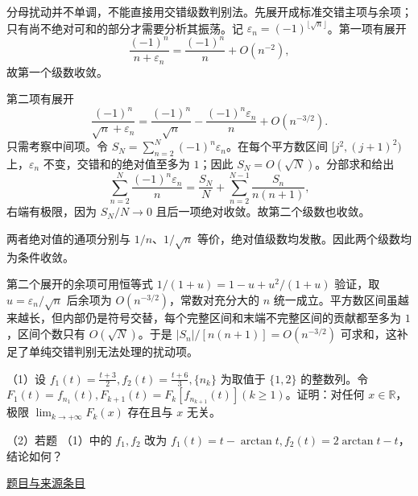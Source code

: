 \documentclass[12pt,fontset=fandol]{ctexart}
\begin{document}
\begin{solve}\label{ans:ch02-16th-A:5}

分母扰动并不单调，不能直接用交错级数判别法。先展开成标准交错主项与余项；只有尚不绝对可和的部分才需要分析其振荡。记 $\varepsilon_n=(-1)^{\lfloor\sqrt n\rfloor}$。第一项有展开
\[
\frac{(-1)^n}{n+\varepsilon_n}
=\frac{(-1)^n}{n}+O(n^{-2}),
\]
故第一个级数收敛。

第二项有展开
\[
\frac{(-1)^n}{\sqrt n+\varepsilon_n}
=\frac{(-1)^n}{\sqrt n}
-\frac{(-1)^n\varepsilon_n}{n}+O(n^{-3/2}).
\]
只需考察中间项。令 $S_N=\sum_{n=2}^N(-1)^n\varepsilon_n$。在每个平方数区间 $[j^2,(j+1)^2)$ 上，$\varepsilon_n$ 不变，交错和的绝对值至多为 $1$；因此 $S_N=O(\sqrt N)$。分部求和给出
\[
\sum_{n=2}^N\frac{(-1)^n\varepsilon_n}{n}
=\frac{S_N}{N}+\sum_{n=2}^{N-1}\frac{S_n}{n(n+1)},
\]
右端有极限，因为 $S_N/N\to0$ 且后一项绝对收敛。故第二个级数也收敛。

两者绝对值的通项分别与 $1/n$、$1/\sqrt n$ 等价，绝对值级数均发散。因此两个级数均为条件收敛。

第二个展开的余项可用恒等式 $1/(1+u)=1-u+u^2/(1+u)$ 验证，取 $u=\varepsilon_n/\sqrt n$ 后余项为 $O(n^{-3/2})$，常数对充分大的 $n$ 统一成立。平方数区间虽越来越长，但内部仍是符号交替，每个完整区间和末端不完整区间的贡献都至多为 $1$，区间个数只有 $O(\sqrt N)$。于是 $|S_n|/[n(n+1)]=O(n^{-3/2})$ 可求和，这补足了单纯交错判别无法处理的扰动项。

\end{solve}

\begin{example}[来源序号6]\label{ex:ch02-16th-A:6}\label{pr:ch02-16th-A:6}

（1）设 $f_{1}(t)=\frac{t+3}{2}, f_{2}(t)=\frac{t+6}{3}, \{n_{k}\}$ 为取值于 $\{1,2\}$ 的整数列。令 $F_{1}(t)=f_{n_{1}}(t), F_{k+1}(t)=F_{k}[f_{n_{k+1}}(t)] (k \geq 1)$。证明：对任何 $x \in \mathbb{R}$，极限 $\lim_{k \to +\infty} F_{k}(x)$ 存在且与 $x$ 无关。

（2）若题 （1）中的 $f_{1}, f_{2}$ 改为 $f_{1}(t)=t-\arctan t, f_{2}(t)=2 \arctan t-t$，结论如何？

\par\href{https://github.com/lzxcr/cmc-mathematics/blob/64916fa1fdbc3e444a652eca204d5669058ee321/src/problems/preliminary/16/06.md}{题目与来源条目}

\end{example}
\end{document}
